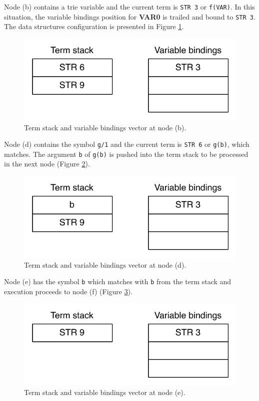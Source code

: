 Node (b) contains a trie variable and the current term is \texttt{STR 3} or \texttt{f(VAR)}.
In this situation, the variable bindings position for \textbf{VAR0} is trailed and bound to \texttt{STR 3}. The data structures configuration is presented in Figure \ref{fig:collect_functor2}.

\begin{figure}[H]
  \centering
    \includegraphics[scale=0.6]{collect_functor2.pdf}
  \caption{Term stack and variable bindings vector at node (b).}
  \label{fig:collect_functor2}
\end{figure}

Node (d) contains the symbol \texttt{g/1} and the current term is \texttt{STR 6}
or \texttt{g(b)}, which matches. The argument \texttt{b} of \texttt{g(b)}
is pushed into the term stack to be processed in the next node (Figure \ref{fig:collect_functor3}).

\begin{figure}[H]
  \centering
    \includegraphics[scale=0.6]{collect_functor3.pdf}
  \caption{Term stack and variable bindings vector at node (d).}
  \label{fig:collect_functor3}
\end{figure}

Node (e) has the symbol \texttt{b} which matches with \texttt{b} from the term stack and
execution proceeds to node (f) (Figure \ref{fig:collect_functor4}).

\begin{figure}[H]
  \centering
    \includegraphics[scale=0.6]{collect_functor4.pdf}
  \caption{Term stack and variable bindings vector at node (e).}
  \label{fig:collect_functor4}
\end{figure}

